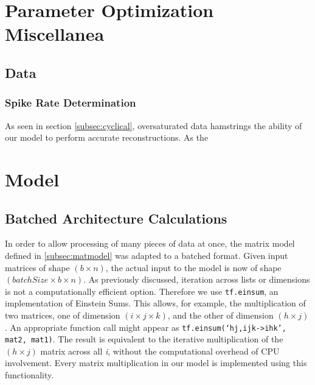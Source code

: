 \begin{appendices}
	\chapter{Parameter Optimization Miscellanea}
	\section{Data}
	\subsection{Spike Rate Determination}
	As seen in section \ref{subsec:cyclical}, oversaturated data hamstrings the 
	ability of our model to perform accurate reconstructions. As the 

	\chapter{Model}
	\section{Batched Architecture Calculations}
	\label{asec:batched}
	In order to allow processing of many pieces of data at once, the matrix 
	model defined in \ref{subsec:matmodel} was adapted to a batched format.  
	Given input matrices of shape $(b \times n)$, the actual input to the model 
	is now of shape $(batchSize \times b \times n)$. As previously discussed, 
	iteration across lists or dimensions is not a computationally efficient 
	option. Therefore we use \texttt{tf.einsum}, an implementation of Einstein 
	Sums. This allows, for example, the multiplication of two matrices, one of 
	dimension $(i \times j \times k)$, and the other of dimension $(h \times 
	j)$. An appropriate function call might appear as
	\texttt{tf.einsum(`hj,ijk->ihk', mat2, mat1)}. The result is equivalent to 
	the iterative multiplication of the $(h \times j)$ matrix across all 
	\textit{i}, without the computational overhead of CPU involvement. Every 
	matrix multiplication in our model is implemented using this functionality.


\end{appendices}
